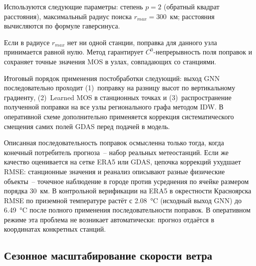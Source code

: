 \documentclass[14pt,a4paper]{extarticle}
\numberwithin{table}{section}
\numberwithin{figure}{section}
\numberwithin{equation}{section}
\begin{document}
Используются следующие параметры: степень \(p = 2\) (обратный
квадрат расстояния), максимальный радиус поиска \(r_{max} = 300\)~км;
расстояния вычисляются по формуле гаверсинуса.

Если в радиусе \(r_{max}\) нет ни одной станции, поправка для данного
узла принимается равной нулю. Метод гарантирует \(C^0\)-непрерывность
поля поправок и сохраняет точные значения MOS в узлах, совпадающих со
станциями.

Итоговый порядок применения постобработки следующий:
выход GNN последовательно проходит (1)~поправку на разницу высот
по вертикальному градиенту, (2)~Learned MOS в станционных точках
и (3)~распространение полученной поправки на все узлы регионального
графа методом IDW. В оперативной схеме дополнительно применяется
коррекция систематического смещения самих полей GDAS перед подачей
в модель.

Описанная последовательность поправок осмысленна только тогда, когда
конечный потребитель прогноза~-- набор реальных метеостанций. Если же
качество оценивается на сетке ERA5 или GDAS, цепочка коррекций
ухудшает RMSE: станционные значения и реанализ описывают разные
физические объекты~-- точечное наблюдение в городе против усреднения
по ячейке размером порядка 30~км. В контрольной верификации на ERA5
в окрестности Красноярска RMSE по приземной температуре растёт с
2.08~°C (исходный выход GNN) до 6.49~°C после полного применения
последовательности поправок. В оперативном режиме эта проблема не
возникает автоматически: прогноз отдаётся в координатах конкретных
станций.

\subsection{Сезонное масштабирование скорости ветра}\label{ux441ux435ux437ux43eux43dux43dux43eux435-ux43cux430ux441ux448ux442ux430ux431ux438ux440ux43eux432ux430ux43dux438ux435-ux432ux435ux442ux440ux430}
\end{document}
